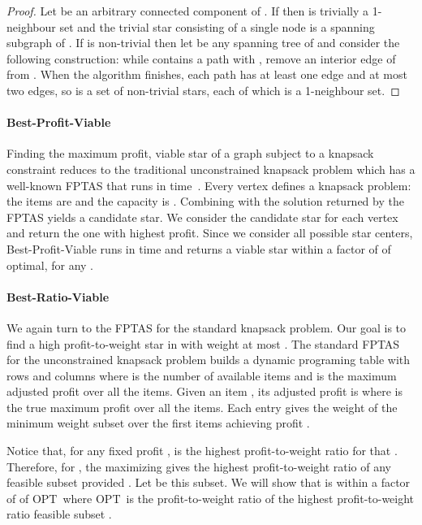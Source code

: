 \documentclass[12pt]{article}
\newcommand{\OPT}{\ensuremath{\mathrm{OPT}\xspace}}
\begin{document}
\begin{proof}
Let  be an arbitrary connected component of .  If  then  is trivially a 1-neighbour set and the trivial star consisting of a single node is a spanning subgraph of .  If  is non-trivial then let  be any spanning tree of  and consider the following construction: while  contains a path  with , remove an interior edge of  from .  When the algorithm finishes, each path has at least one edge and at most two edges, so  is a set of non-trivial stars, each of which is a 1-neighbour set.
\hfill  \end{proof}

\paragraph{{\sc Best-Profit-Viable}}

Finding the maximum profit, viable star of a graph  subject to a knapsack constraint  reduces to the traditional unconstrained knapsack problem which has a well-known FPTAS that runs in  time~\cite{ibarra-kim:jacm1975,vazirani}. Every vertex  defines a knapsack problem:  the items are  and the capacity is .  Combining  with the solution returned by the  FPTAS  yields a candidate star.  We consider the candidate star for each vertex and return the one with highest profit.  Since we consider all possible star centers, {\sc Best-Profit-Viable} runs in  time and returns a viable star within a factor of  of optimal, for any .

\paragraph{{\sc Best-Ratio-Viable}}

We again turn to the FPTAS for the standard knapsack problem.  Our goal is to find a high profit-to-weight star in  with weight at most .  The standard FPTAS for the unconstrained knapsack problem builds a dynamic programing table   with  rows and  columns where  is the number of available items and  is the maximum adjusted profit over all the items.  Given an item , its adjusted profit is  where  is the true maximum profit over all the items.  Each entry  gives the weight of the minimum weight subset over the first  items achieving profit .

Notice that, for any fixed profit ,  is the highest profit-to-weight ratio for that .  Therefore, for , the  maximizing  gives the highest profit-to-weight ratio of any feasible subset provided .  Let  be this subset.  We will show that  is within a factor of  of \OPT\ where \OPT\ is the profit-to-weight ratio of the highest profit-to-weight ratio feasible subset .
\end{document}
